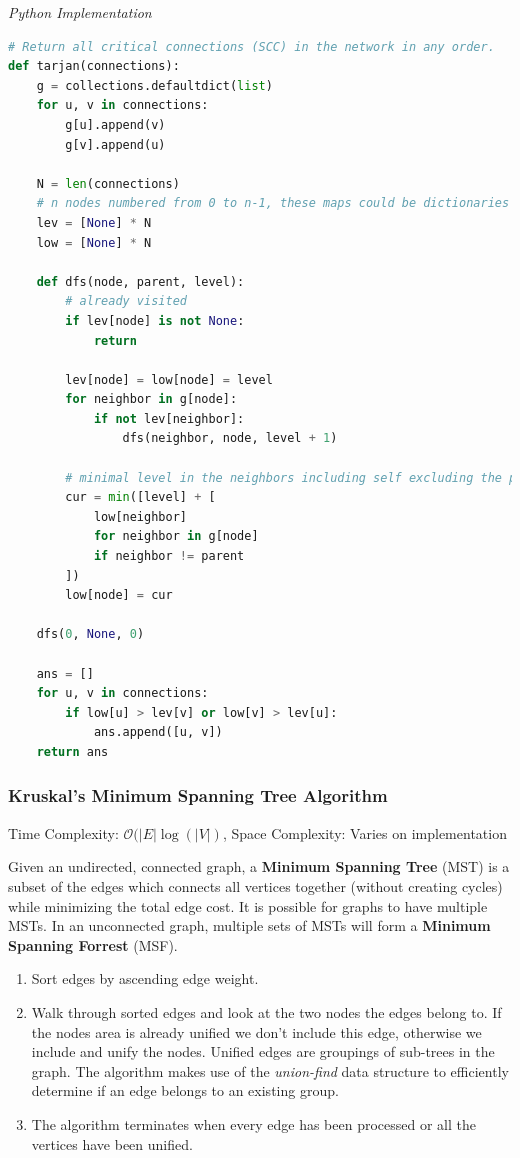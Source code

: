 \documentclass{article}
\newcommand{\bigO}{\mathcal{O}}
\begin{document}
\vspace{8pt} \emph{Python Implementation}
\begin{lstlisting}[language=Python]
# Return all critical connections (SCC) in the network in any order.
def tarjan(connections):
    g = collections.defaultdict(list)
    for u, v in connections:
        g[u].append(v)
        g[v].append(u)

    N = len(connections)
    # n nodes numbered from 0 to n-1, these maps could be dictionaries
    lev = [None] * N
    low = [None] * N

    def dfs(node, parent, level):
        # already visited
        if lev[node] is not None:
            return

        lev[node] = low[node] = level
        for neighbor in g[node]:
            if not lev[neighbor]:
                dfs(neighbor, node, level + 1)

        # minimal level in the neighbors including self excluding the parent
        cur = min([level] + [
            low[neighbor]
            for neighbor in g[node]
            if neighbor != parent
        ])
        low[node] = cur

    dfs(0, None, 0)

    ans = []
    for u, v in connections:
        if low[u] > lev[v] or low[v] > lev[u]:
            ans.append([u, v])
    return ans
\end{lstlisting}
    
    
    \subsubsection{Kruskal's Minimum Spanning Tree Algorithm}
    Time Complexity: $\bigO(|E|\log(|V|)$, Space Complexity: Varies on implementation
    
    Given an undirected, connected graph, a \textbf{Minimum Spanning Tree} (MST) is a subset of the edges which connects all vertices together (without creating cycles) while minimizing the total edge cost. It is possible for graphs to have multiple MSTs. In an unconnected graph, multiple sets of MSTs will form a \textbf{Minimum Spanning Forrest} (MSF).
    
    \begin{enumerate}
        \item Sort edges by ascending edge weight.
        \item Walk through sorted edges and look at the two nodes the edges belong to. If the nodes area is already unified we don't include this edge, otherwise we include and unify the nodes. Unified edges are groupings of sub-trees in the graph. The algorithm makes use of the \textit{union-find} data structure to efficiently determine if an edge belongs to an existing group.
        \item The algorithm terminates when every edge has been processed or all the vertices have been unified.
    \end{enumerate}
    
\end{document}
